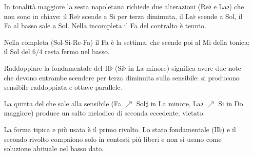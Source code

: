 \begin{esempio}
	\label{ex:napoletana_maggiore}
	In tonalità maggiore la sesta napoletana richiede due alterazioni (Re$\flat$ e La$\flat$) che non sono in chiave: il Re$\flat$ scende a Si per terza diminuita, il La$\flat$ scende a Sol, il Fa al basso sale a Sol. Nella  incompleta il Fa del contralto è tenuto.
\end{esempio}

\begin{esempio}
	\label{ex:napoletana_cadenza_maggiore}
	Nella  completa (Sol-Si-Re-Fa) il Fa è la settima, che scende poi al Mi della tonica; il Sol del 6/4 resta fermo nel basso.
\end{esempio}

\begin{errore}
	\label{err:raddoppio_napoletana}
	Raddoppiare la fondamentale del II$\flat$ (Si$\flat$ in La minore) significa avere due note che devono entrambe scendere per terza diminuita sulla sensibile: si producono sensibile raddoppiata e ottave parallele.
\end{errore}

\begin{errore}
	\label{err:seconda_eccedente_napoletana}
	La quinta del  che sale alla sensibile (Fa $\nearrow$ Sol$\sharp$ in La minore, La$\flat$ $\nearrow$ Si in Do maggiore) produce un salto melodico di seconda eccedente, vietato.
\end{errore}

\begin{errore}
	\label{err:napoletana_fondamentale}
	La forma tipica e più usata è il primo rivolto. Lo stato fondamentale (II$\flat$) e il secondo rivolto compaiono solo in contesti più liberi e non si usano come soluzione abituale nel basso dato.
\end{errore}
